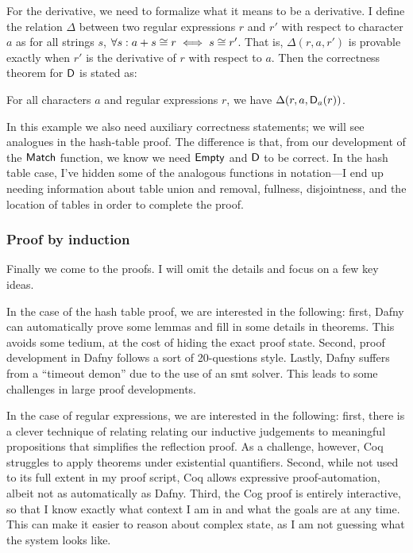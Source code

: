 For the derivative, we need to formalize what it means to be a derivative. I
define the relation \(\Delta\) between two regular expressions \(r\) and \(r'\)
with respect to character \(a\) as for all strings \(s\), \(\forall s: a+s
\mathrel{\cong} r \iff s \mathrel{\cong} r'\). That is, \(\Delta(r, a, r')\) is provable
exactly when \(r'\) is the derivative of \(r\) with respect to \(a\). Then the
correctness theorem for \(\mathsf{D}\) is stated as:
\begin{lem}\label{Lem:r_derive}
    For all characters \(a\) and regular expressions \(r\), we have
    \(\Delta(r, a, \mathsf{D}_a(r))\).
\end{lem}

In this example we also need auxiliary correctness statements; we will see
analogues in the hash-table proof. The difference is that, from our development
of the \(\mathsf{Match}\) function, we know we need \(\mathsf{Empty}\) and
\(\mathsf{D}\) to be correct. In the hash table case, I've hidden some of the
analogous functions in notation---I end up needing information about table union
and removal, fullness, disjointness, and the location of tables in order to
complete the proof.

\subsubsection{Proof by induction}\label{S:ex_ind}

Finally we come to the proofs. I will omit the details and focus on a few key
ideas.

In the case of the hash table proof, we are interested in the following: first,
Dafny can automatically prove some lemmas and fill in some details in theorems.
This avoids some tedium, at the cost of hiding the exact proof state. Second,
proof development in Dafny follows a sort of 20-questions style. Lastly, Dafny
suffers from a ``timeout demon'' due to the use of an \gls{smt} solver. This
leads to some challenges in large proof developments.

In the case of regular expressions, we are interested in the following: first,
there is a clever technique of relating relating our inductive judgements to
meaningful propositions that simplifies the reflection proof. As a challenge,
however, Coq struggles to apply theorems under existential quantifiers. Second,
while not used to its full extent in my proof script, Coq allows expressive
proof-automation, albeit not as automatically as Dafny. Third, the Cog proof is
entirely interactive, so that I know exactly what context I am in and what the
goals are at any time. This can make it easier to reason about complex state, as
I am not guessing what the system looks like.

